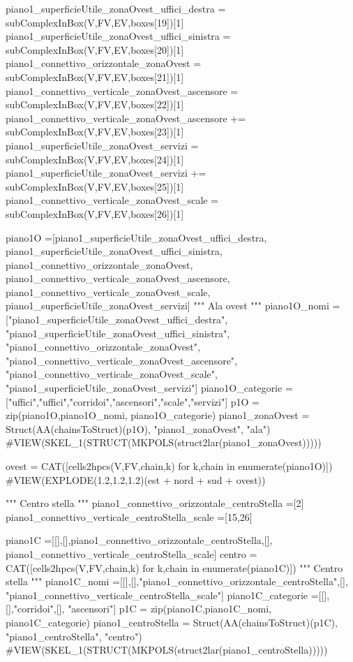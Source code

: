piano1_superficieUtile_zonaOvest_uffici_destra = subComplexInBox(V,FV,EV,boxes[19])[1]
piano1_superficieUtile_zonaOvest_uffici_sinistra = subComplexInBox(V,FV,EV,boxes[20])[1]
piano1_connettivo_orizzontale_zonaOvest = subComplexInBox(V,FV,EV,boxes[21])[1]
piano1_connettivo_verticale_zonaOvest_ascensore = subComplexInBox(V,FV,EV,boxes[22])[1]
piano1_connettivo_verticale_zonaOvest_ascensore += subComplexInBox(V,FV,EV,boxes[23])[1]
piano1_superficieUtile_zonaOvest_servizi = subComplexInBox(V,FV,EV,boxes[24])[1]
piano1_superficieUtile_zonaOvest_servizi += subComplexInBox(V,FV,EV,boxes[25])[1]
piano1_connettivo_verticale_zonaOvest_scale = subComplexInBox(V,FV,EV,boxes[26])[1]

piano1O =[piano1_superficieUtile_zonaOvest_uffici_destra, piano1_superficieUtile_zonaOvest_uffici_sinistra, piano1_connettivo_orizzontale_zonaOvest, piano1_connettivo_verticale_zonaOvest_ascensore, piano1_connettivo_verticale_zonaOvest_scale, piano1_superficieUtile_zonaOvest_servizi]
""" Ala ovest """
piano1O_nomi =["piano1_superficieUtile_zonaOvest_uffici_destra", "piano1_superficieUtile_zonaOvest_uffici_sinistra", "piano1_connettivo_orizzontale_zonaOvest", "piano1_connettivo_verticale_zonaOvest_ascensore", "piano1_connettivo_verticale_zonaOvest_scale", "piano1_superficieUtile_zonaOvest_servizi"]
piano1O_categorie =["uffici","uffici","corridoi","ascensori","scale","servizi"]
p1O = zip(piano1O,piano1O_nomi, piano1O_categorie)
piano1_zonaOvest = Struct(AA(chainsToStruct)(p1O), "piano1_zonaOvest", "ala")
#VIEW(SKEL_1(STRUCT(MKPOLS(struct2lar(piano1_zonaOvest)))))
    
ovest = CAT([cells2hpcs(V,FV,chain,k) for k,chain in enumerate(piano1O)])
#VIEW(EXPLODE(1.2,1.2,1.2)(est + nord + sud + ovest))

""" Centro stella """
piano1_connettivo_orizzontale_centroStella =[2]
piano1_connettivo_verticale_centroStella_scale =[15,26]

piano1C =[[],[],piano1_connettivo_orizzontale_centroStella,[], piano1_connettivo_verticale_centroStella_scale]
centro = CAT([cells2hpcs(V,FV,chain,k) for k,chain in enumerate(piano1C)])
""" Centro stella """
piano1C_nomi =[[],[],"piano1_connettivo_orizzontale_centroStella",[], "piano1_connettivo_verticale_centroStella_scale"]
piano1C_categorie =[[],[],"corridoi",[], "ascensori"]
p1C = zip(piano1C,piano1C_nomi, piano1C_categorie)
piano1_centroStella = Struct(AA(chainsToStruct)(p1C), "piano1_centroStella", "centro")
#VIEW(SKEL_1(STRUCT(MKPOLS(struct2lar(piano1_centroStella)))))

